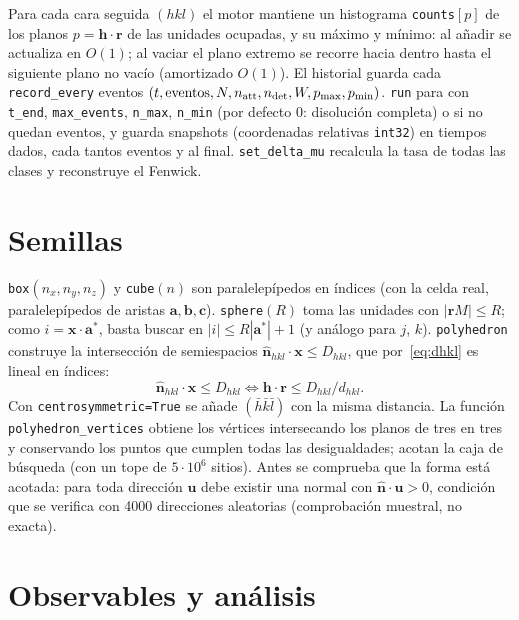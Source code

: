 \documentclass[11pt,a4paper]{article}
\newcommand{\code}[1]{\texttt{#1}}
\newcommand{\vect}[1]{\mathbf{#1}}
\begin{document}
Para cada cara seguida $(hkl)$ el motor mantiene un histograma \code{counts}$[p]$ de los planos
$p=\vect h\cdot\vect r$ de las unidades ocupadas, y su máximo y mínimo: al añadir se actualiza en
$O(1)$; al vaciar el plano extremo se recorre hacia dentro hasta el siguiente plano no vacío
(amortizado $O(1)$). El historial guarda cada \code{record\_every} eventos
$(t,\text{eventos},N,n_{\rm att},n_{\rm det},W,p_{\max},p_{\min})$. \code{run} para con \code{t\_end},
\code{max\_events}, \code{n\_max}, \code{n\_min} (por defecto 0: disolución completa) o si no quedan
eventos, y guarda snapshots (coordenadas relativas \code{int32}) en tiempos dados, cada tantos eventos
y al final. \code{set\_delta\_mu} recalcula la tasa de todas las clases y reconstruye el Fenwick.

\section{Semillas}
\label{sec:semillas}

\code{box}$(n_x,n_y,n_z)$ y \code{cube}$(n)$ son paralelepípedos en índices (con la celda real,
paralelepípedos de aristas $\vect a,\vect b,\vect c$). \code{sphere}$(R)$ toma las unidades con
$|\vect rM|\le R$; como $i=\vect x\cdot\vect a^*$, basta buscar en $|i|\le R|\vect a^*|+1$ (y análogo
para $j$, $k$). \code{polyhedron} construye la intersección de semiespacios
$\hat{\vect n}_{hkl}\cdot\vect x\le D_{hkl}$, que por~\eqref{eq:dhkl} es lineal en índices:
\begin{equation}
\hat{\vect n}_{hkl}\cdot\vect x\le D_{hkl}\iff \vect h\cdot\vect r\le D_{hkl}/d_{hkl}.
\label{eq:poliedro}
\end{equation}
Con \code{centrosymmetric=True} se añade $(\bar h\bar k\bar l)$ con la misma distancia. La función
\code{polyhedron\_vertices} obtiene los vértices intersecando los planos de tres en tres y conservando los
puntos que cumplen todas las desigualdades; acotan la caja de búsqueda (con un tope de $5\cdot10^6$
sitios). Antes se comprueba que la forma está acotada: para toda dirección $\vect u$ debe existir una
normal con $\hat{\vect n}\cdot\vect u>0$, condición que se verifica con 4000 direcciones aleatorias
(comprobación muestral, no exacta).

\section{Observables y análisis}
\label{sec:analisis}
\end{document}
